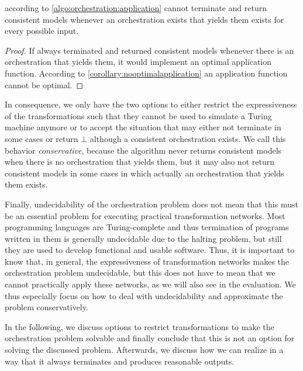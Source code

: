 \begin{corollary}
     according to \autoref{algo:orchestration:application} cannot terminate and return consistent models whenever an orchestration exists that yields them exists for every possible input.
\end{corollary}

\begin{proof}
    If  always terminated and returned consistent models whenever there is an orchestration that yields them, it would implement an optimal application function. 
    According to \autoref{corollary:nooptimalapplication} an application function cannot be optimal.
\end{proof}

In consequence, we only have the two options to either restrict the expressiveness of the transformations such that they cannot be used to simulate a Turing machine anymore or to accept the situation that  may either not terminate in some cases or return $\bot$ although a consistent orchestration exists.
We call this behavior \emph{conservative}, because the algorithm never returns consistent models when there is no orchestration that yields them, but it may also not return consistent models in some cases in which actually an orchestration that yields them exists.

Finally, undecidability of the orchestration problem does not mean that this must be an essential problem for executing practical transformation networks.
Most programming languages are Turing-complete and thus termination of programs written in them is generally undecidable due to the halting problem, but still they are used to develop functional and usable software.
Thus, it is important to know that, in general, the expressiveness of transformation networks makes the orchestration problem undecidable, but this does not have to mean that we cannot practically apply these networks, as we will also see in the evaluation.
We thus especially focus on how to deal with undecidability and approximate the problem conservatively.

In the following, we discuss options to restrict transformations to make the orchestration problem solvable and finally conclude that this is not an option for solving the discussed problem.
Afterwards, we discuss how we can realize  in a way that it always terminates and produces reasonable outputs.


